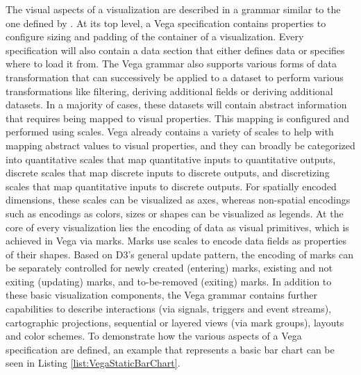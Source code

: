 The visual aspects of a visualization are described in a grammar similar to the one defined by \cite{GrammarOfGraphics}. 
At its top level, a Vega specification contains properties to configure sizing and padding of the container of a visualization. 
Every specification will also contain a data section that either defines data or specifies where to load it from. 
The Vega grammar also supports various forms of data transformation that can successively be applied to a dataset to perform various transformations like filtering, deriving additional fields or deriving additional datasets.
In a majority of cases, these datasets will contain abstract information that requires being mapped to visual properties.
This mapping is configured and performed using scales. 
Vega already contains a variety of scales to help with mapping abstract values to visual properties, and they can broadly be categorized into quantitative scales that map quantitative inputs to quantitative outputs, discrete scales that map discrete inputs to discrete outputs, and discretizing scales that map quantitative inputs to discrete outputs.
For spatially encoded dimensions, these scales can be visualized as axes, whereas non-spatial encodings such as encodings as colors, sizes or shapes can be visualized as legends.
At the core of every visualization lies the encoding of data as visual primitives, which is achieved in Vega via marks.
Marks use scales to encode data fields as properties of their shapes.
Based on D3's general update pattern, the encoding of marks can be separately controlled for newly created (entering) marks, existing and not exiting (updating) marks, and to-be-removed (exiting) marks.  
In addition to these basic visualization components, the Vega grammar contains further capabilities to describe interactions (via signals, triggers and event streams), cartographic projections, sequential or layered views (via mark groups), layouts and color schemes. 
To demonstrate how the various aspects of a Vega specification are defined, an example that represents a basic bar chart can be seen in Listing \ref{list:VegaStaticBarChart}.

\begin{samepage}
 Vega specification of a static bar chart. Demonstrates the principle of data, scales, axes and marks. 
  },
]{listings/vega-static-bar-chart.json}
\end{samepage}

